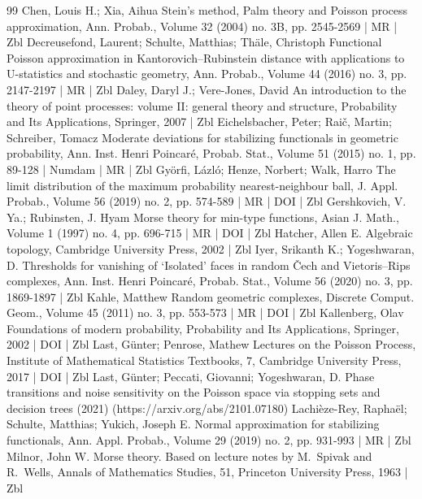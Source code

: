 \begin{thebibliography}{99}
Chen, Louis H.; Xia, Aihua Stein’s method, Palm theory and Poisson process approximation, Ann. Probab., Volume 32 (2004) no. 3B, pp. 2545-2569 | MR | Zbl
Decreusefond, Laurent; Schulte, Matthias; Thäle, Christoph Functional Poisson approximation in Kantorovich–Rubinstein distance with applications to U-statistics and stochastic geometry, Ann. Probab., Volume 44 (2016) no. 3, pp. 2147-2197 | MR | Zbl
Daley, Daryl J.; Vere-Jones, David An introduction to the theory of point processes: volume II: general theory and structure, Probability and Its Applications, Springer, 2007 | Zbl
Eichelsbacher, Peter; Raič, Martin; Schreiber, Tomacz Moderate deviations for stabilizing functionals in geometric probability, Ann. Inst. Henri Poincaré, Probab. Stat., Volume 51 (2015) no. 1, pp. 89-128 | Numdam | MR | Zbl
Györfi, Lázló; Henze, Norbert; Walk, Harro The limit distribution of the maximum probability nearest-neighbour ball, J. Appl. Probab., Volume 56 (2019) no. 2, pp. 574-589 | MR | DOI | Zbl
Gershkovich, V. Ya.; Rubinsten, J. Hyam Morse theory for min-type functions, Asian J. Math., Volume 1 (1997) no. 4, pp. 696-715 | MR | DOI | Zbl
Hatcher, Allen E. Algebraic topology, Cambridge University Press, 2002 | Zbl
Iyer, Srikanth K.; Yogeshwaran, D. Thresholds for vanishing of ‘Isolated’ faces in random Čech and Vietoris–Rips complexes, Ann. Inst. Henri Poincaré, Probab. Stat., Volume 56 (2020) no. 3, pp. 1869-1897 | Zbl
Kahle, Matthew Random geometric complexes, Discrete Comput. Geom., Volume 45 (2011) no. 3, pp. 553-573 | MR | DOI | Zbl
Kallenberg, Olav Foundations of modern probability, Probability and Its Applications, Springer, 2002 | DOI | Zbl
Last, Günter; Penrose, Mathew Lectures on the Poisson Process, Institute of Mathematical Statistics Textbooks, 7, Cambridge University Press, 2017 | DOI | Zbl
Last, Günter; Peccati, Giovanni; Yogeshwaran, D. Phase transitions and noise sensitivity on the Poisson space via stopping sets and decision trees (2021) (https://arxiv.org/abs/2101.07180)
Lachièze-Rey, Raphaël; Schulte, Matthias; Yukich, Joseph E. Normal approximation for stabilizing functionals, Ann. Appl. Probab., Volume 29 (2019) no. 2, pp. 931-993 | MR | Zbl
Milnor, John W. Morse theory. Based on lecture notes by M. Spivak and R. Wells, Annals of Mathematics Studies, 51, Princeton University Press, 1963 | Zbl

\end{thebibliography}
